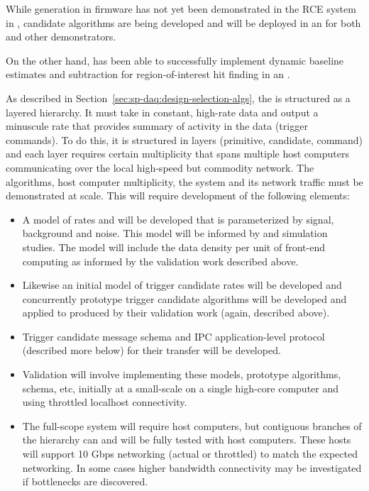 \label{sec:sp-daq:validation-firmware-trigger-primitives}

While  generation in firmware has not yet been
demonstrated in the RCE system in , candidate
algorithms are being developed and will be deployed in an 
for both  and other demonstrators. 

On the other hand, \microboone has been able to
successfully implement dynamic baseline estimates and subtraction
for region-of-interest hit finding in an  \cite{NNN18}.


As described in Section~\ref{sec:sp-daq:design-selection-algs}, the  is structured as a layered hierarchy. 
It must take in constant, high-rate data and output a minuscule rate that provides summary of activity in the data (trigger commands).
To do this, it is structured in layers (primitive, candidate, command) and each layer requires certain multiplicity that spans multiple host computers communicating over the local high-speed but commodity network. 
The algorithms, host computer multiplicity, the  system and its network traffic must be demonstrated at scale.
This will require development of the following elements:

\begin{itemize}
\item A model of  rates and will be developed that is parameterized by signal, background and noise.  This model will be informed by  and simulation studies.  The model will include the data density per unit of front-end computing as informed by the  validation work described above.
\item Likewise an initial model of trigger candidate rates will be developed and concurrently prototype trigger candidate algorithms will be developed and applied to  produced by their validation work (again, described above).
\item Trigger candidate message schema and IPC application-level protocol (described more below) for their transfer will be developed.
\item Validation will involve implementing these models, prototype algorithms, schema, etc,  initially at a small-scale on a single high-core computer and using throttled localhost connectivity.
\item The full-scope system will require  host computers, but contiguous branches of the hierarchy can and will be fully tested with  host computers. 
  These hosts will support 10 Gbps networking (actual or throttled) to match the expected networking. 
  In some cases higher bandwidth connectivity may be investigated if bottlenecks are discovered. 
\end{itemize}



